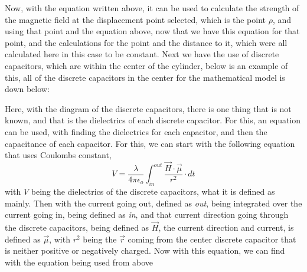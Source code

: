\documentclass[]{article}
\begin{document}
Now, with the equation written above, it can be used to calculate the strength of the magnetic field at the displacement point selected, which is the point $\rho$, and using that point and the equation above, now that we have this equation for that point, and the calculations for the point and the distance to it, which were all calculated here in this case to be constant. Next we have the use of discrete capacitors, which are within the center of the cylinder, below is an example of this, all of the discrete capacitors in the center for the mathematical model is down below: 
\begin{figure}
\end{figure}
Here, with the diagram of the discrete capacitors, there is one thing that is not known, and that is the dielectrics of each discrete capacitor. For this, an equation can be used, with finding the dielectrics for each capacitor, and then the capacitance of each capacitor. For this, we can start with the following equation that uses Coulombs constant,
\begin{equation}
V = \frac{\lambda}{4\pi\epsilon_o} \int_{in}^{out} \frac{\vec{H}\cdot \vec{\mu}}{r^2} \cdot dt
\end{equation}
with $V$ being the dielectrics of the discrete capacitors, what it is defined as mainly. Then with the current going out, defined as \textit{out}, being integrated over the current going in, being defined as \textit{in}, and that current direction going through the discrete capacitors, being defined as $\vec{H}$, the current direction and current, is defined as $\vec{\mu}$, with $r^2$ being the $\vec{r}$ coming from the center discrete capacitor that is neither positive or negatively charged. Now with this equation, we can find with the equation being used from above 
\end{document}
